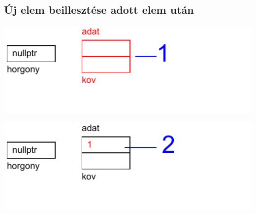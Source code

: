 \subsection{Új elem beillesztése adott elem után}
\begin{frame}
  \begin{center}
    \includegraphics[scale=0.6]{lista1/list1-01.pdf}
  \end{center}
  \vspace{-.2cm}
  \begin{exampleblock}{}
    \vspace{-.2cm}
    
    \vspace{-.2cm}
  \end{exampleblock}
\end{frame}

\begin{frame}
  \begin{center}
    \includegraphics[scale=0.6]{lista1/list1-02.pdf}
  \end{center}
  \vspace{-.2cm}
  \begin{exampleblock}{}
    \vspace{-.2cm}
    
    \vspace{-.2cm}
  \end{exampleblock}
\end{frame}

